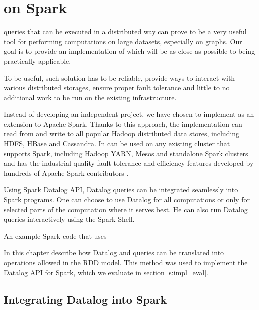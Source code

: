 

\chapter{\datalogra on Spark}\label{r:implementation}


\datalogra queries that can be executed in a distributed way can prove to be a very useful tool for performing computations on large datasets, especially on graphs. Our goal is to provide an implementation of \datalogra which will be as close as possible to being practically applicable.

To be useful, such solution has to be reliable, provide ways to interact with various distributed storages, ensure proper fault tolerance and little to no additional work to be run on the existing infrastructure.

Instead of developing an independent project, we have chosen to implement \datalogra as an extension to Apache Spark. Thanks to this approach, the implementation can read from and write to all popular Hadoop distributed data stores, including HDFS, HBase and Cassandra. In can be used on any existing cluster that supports Spark, including Hadoop YARN, Mesos and standalone Spark clusters and has the industrial-quality fault tolerance and efficiency features developed by hundreds of Apache Spark contributors . 


Using Spark Datalog API, Datalog queries can be integrated seamlessly into Spark programs. One can choose to use Datalog for all computations or only for selected parts of the computation where it serves best. He can also run Datalog queries interactively using the Spark Shell.

An example Spark code that uses 

In this chapter describe how Datalog and \datalogra queries can be translated into operations allowed in the RDD model. This method was used to implement the  Datalog API for Spark, which we evaluate in section \ref{s:impl_eval}.

\section{Integrating Datalog into Spark}

